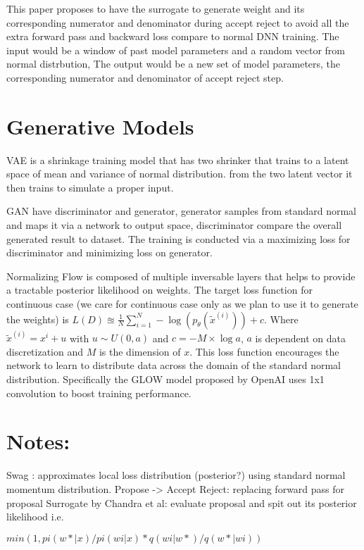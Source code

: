 \documentclass[honours,12pt]{unswthesis}
\numberwithin{equation}{section}
\begin{document}
This paper proposes to have the surrogate to generate weight and its corresponding numerator and denominator during accept reject to avoid all the extra forward pass and backward loss compare to normal DNN training. The input would be a window of past model parameters and a random vector from normal distrbution, The output would be a new set of model parameters, the corresponding numerator and denominator of accept reject step.

\section{Generative Models}

VAE is a shrinkage training model that has two shrinker that trains to a latent space of mean and variance of normal distribution.
from the two latent vector it then trains to simulate a proper input.

GAN have discriminator and generator, generator samples from standard normal and maps it via a network to output space, discriminator compare the overall generated result to dataset. The training is conducted via a maximizing loss for discriminator and minimizing loss on generator.

Normalizing Flow is composed of multiple inversable layers that helps to provide a tractable posterior likelihood on weights. The target loss function for continuous case (we care for continuous case only as we plan to use it to generate the weights) is $L(D) \approxeq \frac{1}{N}\sum_{i=1}^N - \log(p_\theta(\tilde{x}^{(i)}))+c$. Where $\tilde{x}^{(i)} = x^{i}+u$ with $u\sim U(0,a)$ and $c=-M\times \log{a}$, $a$ is dependent on data discretization and $M$ is the dimension of $x$. This loss function encourages the network to learn to distribute data across the domain of the standard normal distribution. Specifically the GLOW model proposed by OpenAI \cite{openai2018glow} uses 1x1 convolution to boost training performance.


\section{ Notes:}

Swag : approximates local loss distribution (posterior?) using standard normal momentum distribution.
Propose -> Accept Reject: replacing forward pass for proposal 
Surrogate by Chandra et al: evaluate proposal and spit out its posterior likelihood
    i.e. 
    
    $min(1, pi(w*|x)/pi(wi|x) *  q(wi|w*)/q(w*|wi) )$
    
\end{document}
